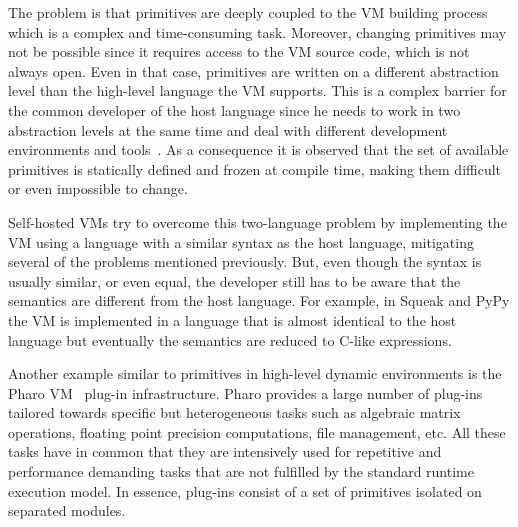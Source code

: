 \documentclass[10pt,preprint,letter]{sigplanconf}
\newcommand{\PH}  {Pharo\xspace}
\begin{document}
The problem is that primitives are deeply coupled to the VM building process which is a complex and time-consuming task. 
Moreover, changing primitives may not be possible since it requires access to the VM source code, which is not always open.
Even in that case, primitives are written on a different abstraction level than the high-level language the VM supports. 
This is a complex barrier for the common developer of the host language since he needs to work in two abstraction levels at the same time and deal with different development environments and tools~\cite{Fram09a}. 
As a consequence it is observed that the set of available primitives is statically defined and frozen at compile time, making them difficult or even impossible to change. 

Self-hosted VMs try to overcome this two-language problem by implementing the VM using a language with a similar syntax as the host language, mitigating several of the problems mentioned previously. 
But, even though the syntax is usually similar, or even equal, the developer still has to be aware that the semantics are different from the host language. 
For example, in Squeak and PyPy the VM is implemented in a language that is almost identical to the host language but eventually the semantics are reduced to C-like expressions. 

Another example similar to primitives in high-level dynamic environments is the \PH VM~\cite{Pharo,Blac09a} plug-in infrastructure. 
\PH provides a large number of plug-ins tailored towards specific but heterogeneous tasks such as algebraic matrix operations, floating point precision computations, file management, etc. 
All these tasks have in common that they are intensively used for repetitive and performance demanding tasks that are not fulfilled by the standard runtime execution model. 
In essence, plug-ins consist of a set of primitives isolated on separated modules.   
\end{document}

